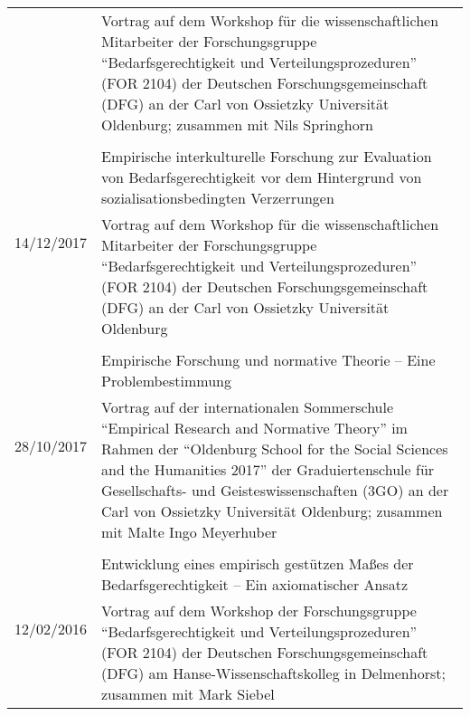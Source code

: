 \documentclass[a4paper,10pt]{article}
\begin{document}
\begin{longtable}{p{}p{}}
& \footnotesize{Vortrag auf dem Workshop für die wissenschaftlichen Mitarbeiter der Forschungsgruppe \enquote{Bedarfsgerechtigkeit und Verteilungsprozeduren} (FOR 2104) der Deutschen Forschungsgemeinschaft (DFG) an der Carl von Ossietzky Universität Oldenburg; zusammen mit Nils Springhorn}\\
\\
\multirow{2}{1,75cm}{\footnotesize{14/12/2017}} & Empirische interkulturelle Forschung zur Evaluation von Bedarfsgerechtigkeit vor dem Hintergrund von sozialisationsbedingten Verzerrungen\\
& \footnotesize{Vortrag auf dem Workshop für die wissenschaftlichen Mitarbeiter der Forschungsgruppe \enquote{Bedarfsgerechtigkeit und Verteilungsprozeduren} (FOR 2104) der Deutschen Forschungsgemeinschaft (DFG) an der Carl von Ossietzky Universität Oldenburg}\\
\\
\multirow{2}{1,75cm}{\footnotesize{28/10/2017}} & Empirische Forschung und normative Theorie -- Eine Problembestimmung\\
& \footnotesize{Vortrag auf der internationalen Sommerschule \enquote{Empirical Research and Normative Theory} im Rahmen der \enquote{Oldenburg School for the Social Sciences and the Humanities 2017} der Graduiertenschule für Gesellschafts- und Geisteswissenschaften (3GO) an der Carl von Ossietzky Universität Oldenburg; zusammen mit Malte Ingo Meyerhuber}\\
\\
\multirow{2}{1,75cm}{\footnotesize{12/02/2016}} & Entwicklung eines empirisch gestützen Maßes der Bedarfsgerechtigkeit -- Ein axiomatischer Ansatz\\
& \footnotesize{Vortrag auf dem Workshop der Forschungsgruppe \enquote{Bedarfsgerechtigkeit und Verteilungsprozeduren} (FOR 2104) der Deutschen Forschungsgemeinschaft (DFG) am Hanse-Wissenschaftskolleg in Delmenhorst; zusammen mit Mark Siebel}\\
\end{longtable}


\clearpage
\end{document}
